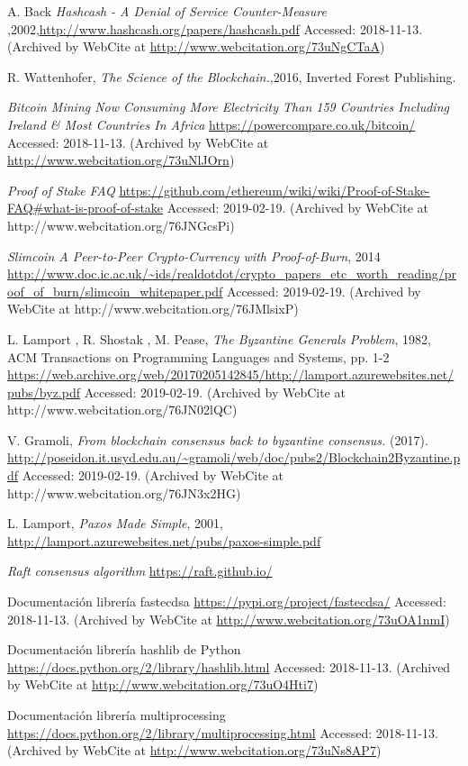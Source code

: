 \documentclass[final, 12pt,oneside]{class_diss}
\begin{document}
\begin{thebibliography}{10}
 A. Back \textit{Hashcash - A Denial of Service Counter-Measure
},2002,\url{http://www.hashcash.org/papers/hashcash.pdf} Accessed: 2018-11-13. (Archived by WebCite at \url{http://www.webcitation.org/73uNgCTaA})

R. Wattenhofer, \textit{The Science of the Blockchain.},2016, Inverted Forest Publishing.

 \textit{Bitcoin Mining Now Consuming More Electricity Than 159 Countries Including Ireland \& Most Countries In Africa} \url{https://powercompare.co.uk/bitcoin/} Accessed: 2018-11-13. (Archived by WebCite at \url{http://www.webcitation.org/73uNlJOrn})

 \textit{Proof of Stake FAQ} \url{https://github.com/ethereum/wiki/wiki/Proof-of-Stake-FAQ#what-is-proof-of-stake} Accessed: 2019-02-19. (Archived by WebCite at http://www.webcitation.org/76JNGcsPi)

 \textit{Slimcoin
A Peer-to-Peer Crypto-Currency with Proof-of-Burn}, 2014  \url{http://www.doc.ic.ac.uk/~ids/realdotdot/crypto_papers_etc_worth_reading/proof_of_burn/slimcoin_whitepaper.pdf} Accessed: 2019-02-19. (Archived by WebCite at http://www.webcitation.org/76JMlsixP)

L. Lamport , R. Shostak , M. Pease, \textit{The Byzantine Generals Problem}, 1982,  ACM Transactions on Programming Languages and Systems, pp. 1-2 \url{https://web.archive.org/web/20170205142845/http://lamport.azurewebsites.net/pubs/byz.pdf} Accessed: 2019-02-19. (Archived by WebCite at http://www.webcitation.org/76JN02lQC)

V. Gramoli, \textit{From blockchain consensus back to byzantine consensus.} (2017).  
\url{http://poseidon.it.usyd.edu.au/~gramoli/web/doc/pubs2/Blockchain2Byzantine.pdf} Accessed: 2019-02-19. (Archived by WebCite at http://www.webcitation.org/76JN3x2HG)

 L. Lamport, \textit{Paxos Made Simple}, 2001, \url{http://lamport.azurewebsites.net/pubs/paxos-simple.pdf}

 \textit{Raft consensus algorithm} \url{https://raft.github.io/}

 Documentación librería fastecdsa \url{https://pypi.org/project/fastecdsa/} Accessed: 2018-11-13. (Archived by WebCite at \url{http://www.webcitation.org/73uOA1nmI})

 Documentación librería hashlib de Python \url{https://docs.python.org/2/library/hashlib.html} Accessed: 2018-11-13. (Archived by WebCite at \url{http://www.webcitation.org/73uO4Hti7})

 Documentación librería multiprocessing \url{https://docs.python.org/2/library/multiprocessing.html} Accessed: 2018-11-13. (Archived by WebCite at \url{http://www.webcitation.org/73uNs8AP7})

\end{thebibliography}
\end{document}
